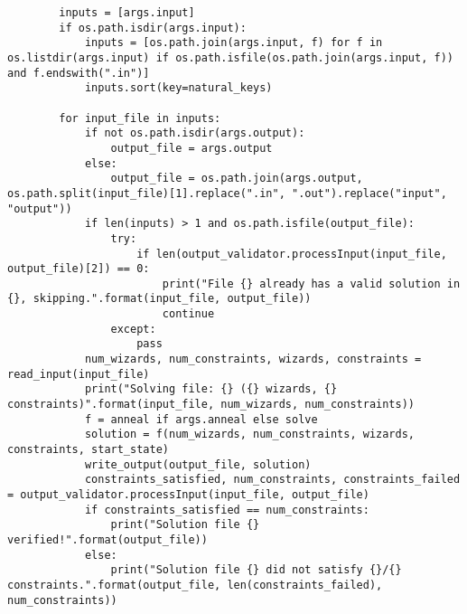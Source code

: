 \documentclass{article}
\theoremstyle{plain}
\numberwithin{theorem}{subsection}
\theoremstyle{definition}
\numberwithin{equation}{subsection}
\begin{document}
\begin{lstlisting}
        inputs = [args.input]
        if os.path.isdir(args.input):
            inputs = [os.path.join(args.input, f) for f in os.listdir(args.input) if os.path.isfile(os.path.join(args.input, f)) and f.endswith(".in")]
            inputs.sort(key=natural_keys)
        
        for input_file in inputs:
            if not os.path.isdir(args.output):
                output_file = args.output
            else:
                output_file = os.path.join(args.output, os.path.split(input_file)[1].replace(".in", ".out").replace("input", "output"))
            if len(inputs) > 1 and os.path.isfile(output_file):
                try:
                    if len(output_validator.processInput(input_file, output_file)[2]) == 0:
                        print("File {} already has a valid solution in {}, skipping.".format(input_file, output_file))
                        continue
                except:
                    pass
            num_wizards, num_constraints, wizards, constraints = read_input(input_file)
            print("Solving file: {} ({} wizards, {} constraints)".format(input_file, num_wizards, num_constraints))
            f = anneal if args.anneal else solve
            solution = f(num_wizards, num_constraints, wizards, constraints, start_state)
            write_output(output_file, solution)
            constraints_satisfied, num_constraints, constraints_failed = output_validator.processInput(input_file, output_file)
            if constraints_satisfied == num_constraints:
                print("Solution file {} verified!".format(output_file))
            else:
                print("Solution file {} did not satisfy {}/{} constraints.".format(output_file, len(constraints_failed), num_constraints))
    
\end{lstlisting}

\end{document}
